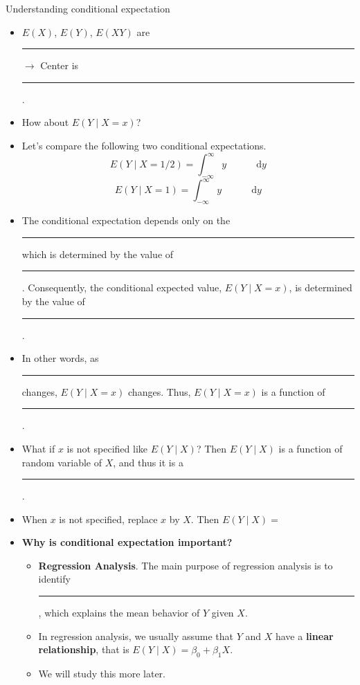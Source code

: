 \documentclass{article}
\newcommand{\blankul}[1]{\rule[-1.5mm]{#1}{0.15mm}}	%
\newcommand{\integral}[4]{\displaystyle \int_{#1}^{#2} #3 \,\mathrm{d} #4}		%
\begin{document}
Understanding conditional expectation\bigskip
\begin{itemize}
    \item $E(X)$, $E(Y)$, $E(XY)$ are \blankul{3cm} $\rightarrow$ Center is \blankul{4cm}.
    \item How about $E(Y \mid X=x)$?
    \item[] Let's compare the following two conditional expectations. 
    \[E(Y \mid X = 1/2) = \integral{-\infty}{\infty}{y \hspace{35pt}}{y}\] 
    \[E(Y \mid X = 1) = \integral{-\infty}{\infty}{y \hspace{35pt}}{y}\]
    \item The conditional expectation depends only on the \blankul{5cm} which is determined by the value of \blankul{1cm}. Consequently, the conditional expected value, $E(Y \mid X = x)$, is determined by the value of \blankul{1cm}.
    \item[] In other words, as \blankul{1cm} changes, $E(Y \mid X = x)$ changes. Thus, $E(Y \mid X = x)$ is a function of \blankul{1cm}.\bigskip
    \item What if $x$ is not specified like $E(Y \mid X)$? Then $E(Y \mid X)$ is a function of random variable of $X$, and thus it is a \blankul{4cm}.
    \item[] When $x$ is not specified, replace $x$ by $X$. Then $E(Y \mid X) = $\bigskip
    \item \textbf{Why is conditional expectation important?}
    \begin{itemize}
        \item \textbf{Regression Analysis}. The main purpose of regression analysis is to identify \blankul{2cm}, which explains the mean behavior of $Y$ given $X$.
        \item In regression analysis, we usually assume that $Y$ and $X$ have a \textbf{linear relationship}, that is $E(Y \mid X) = \beta_0 + \beta_1 X$.
        \item We will study this more later.
    \end{itemize}
\end{itemize}\bigskip
\end{document}
